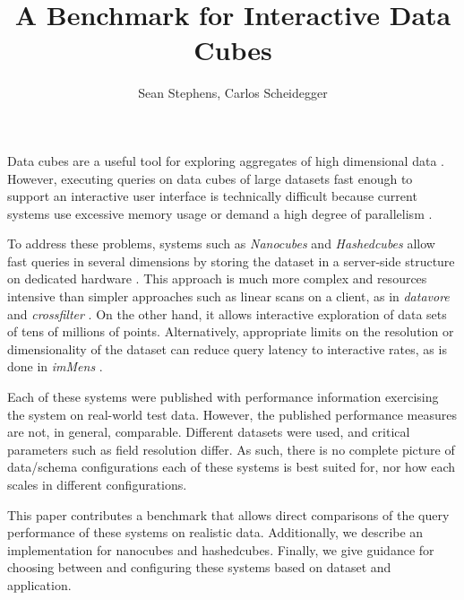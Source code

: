 \documentclass[journal]{vgtc}                %
\title{A Benchmark for Interactive Data Cubes}
\author{Sean Stephens, Carlos Scheidegger}
\begin{document}


\maketitle

Data cubes are a useful tool for exploring aggregates of high dimensional data
\cite{data_cubes}. However, executing queries on data cubes of large datasets
fast enough to support an interactive user interface is technically difficult
because current systems use excessive memory usage or demand a high degree of
parallelism \cite{nanocubes, parallel_paper}.

To address these problems, systems such as \textit{Nanocubes} and
\textit{Hashedcubes} allow fast queries in several dimensions by storing the
dataset in a server-side structure on dedicated hardware
\cite{nanocube}\cite{hashedcube}. This approach is much more complex and
resources intensive than simpler approaches such as linear scans on a client,
as in \textit{datavore} and \textit{crossfilter} \cite{datavore,crossfilter}.
On the other hand, it allows interactive exploration of data sets of tens of
millions of points. Alternatively, appropriate limits on the resolution or dimensionality of the dataset can reduce query latency to interactive rates, as is done in \textit{imMens} \cite{2013-immens}. 

Each of these systems were published with performance information exercising
the system on real-world test data. However, the published performance measures
are not, in general, comparable. Different datasets were used, and critical
parameters such as field resolution differ. As such, there is no complete
picture of data/schema configurations each of these systems is best suited for,
nor how each scales in different configurations.

This paper contributes a benchmark that allows direct comparisons of the query
performance of these systems on realistic data. Additionally, we describe an
implementation for nanocubes and hashedcubes. Finally, we
give guidance for choosing between and configuring these systems based on
dataset and application.
\end{document}
